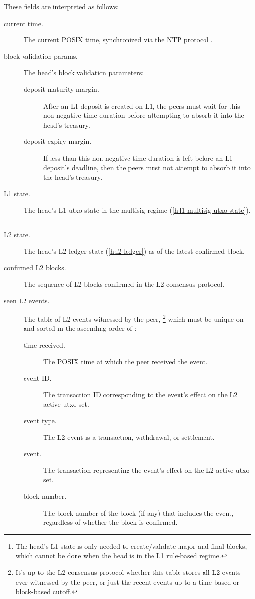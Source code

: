 \documentclass[../hydrozoa.tex]{subfiles}
\begin{document}
These fields are interpreted as follows:
\begin{description}
  \item[current time.] The current POSIX time, synchronized via the NTP protocol \citep{MillsEtAlNetworkTimeProtocol2010}.
  \item[block validation params.] The head's block validation parameters:
    \begin{description}
      \item[deposit maturity margin.] After an L1 deposit is created on L1, the peers must wait for this non-negative time duration before attempting to absorb it into the head's treasury.
      \item[deposit expiry margin.] If less than this non-negative time duration is left before an L1 deposit's deadline, then the peers must not attempt to absorb it into the head's treasury.
    \end{description}
  \item[L1 state.] The head's L1 utxo state in the multisig regime (\cref{h:l1-multisig-utxo-state}).%
    \footnote{The head's L1 state is only needed to create/validate major and final blocks, which cannot be done when the head is in the L1 rule-based regime.}
  \item[L2 state.] The head's L2 ledger state (\cref{h:l2-ledger}) as of the latest confirmed block.
  \item[confirmed L2 blocks.] The sequence of L2 blocks confirmed in the L2 consensus protocol.
  \item[seen L2 events.] The table of L2 events witnessed by the peer,%
    \footnote{It's up to the L2 consensus protocol whether this table stores all L2 events ever witnessed by the peer, or just the recent events up to a time-based or block-based cutoff.}
    which must be unique on  and sorted in the ascending order of :
    \begin{description}
      \item[time received.] The POSIX time at which the peer received the event.
      \item[event ID.] The transaction ID corresponding to the event's effect on the L2 active utxo set.
      \item[event type.] The L2 event is a transaction, withdrawal, or settlement.
      \item[event.] The transaction representing the event's effect on the L2 active utxo set.
      \item[block number.] The block number of the block (if any) that includes the event, regardless of whether the block is confirmed.
    \end{description}
\end{description}
\end{document}
